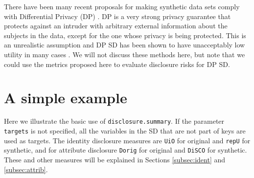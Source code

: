 \documentclass[12pt]{article}
\begin{document}
There have been many recent proposals for making synthetic data sets comply with  Differential Privacy (DP) \cite{Dwork2006b}. DP is a very strong privacy guarantee that protects against an intruder with arbitrary external information about the subjects in the data, except for the one whose privacy is being protected. This is an unrealistic assumption and DP SD has been shown to have unacceptably low utility in many cases \cite{bowen_ss, groundhog}. We will not discuss these methods here, but note that we could use the metrics proposed here to evaluate disclosure risks for DP SD. 




\section[A simple example]{A simple example}\label{sec:simpexamp}
Here we illustrate the basic use of \texttt{disclosure.summary}. If the parameter \texttt{targets} is not specified, all the variables in the SD that are not part of keys are used as targets.
The identity disclosure measures are \texttt{UiO} for original and \texttt{repU} for synthetic, and for attribute disclosure \texttt{Dorig} for original and \texttt{DiSCO} for synthetic. These and other measures will be explained in Sections \ref{subsec:ident} and \ref{subsec:attrib}.
\end{document}
